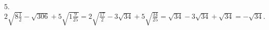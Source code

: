 5. $2\sqrt{8\frac{1}{2}}-\sqrt{306}+5\sqrt{1\frac{9}{25}}=2\sqrt{\frac{17}{2}}-3\sqrt{34}+5\sqrt{\frac{34}{25}}=
\sqrt{34}-3\sqrt{34}+\sqrt{34}=-\sqrt{34}.$\\
